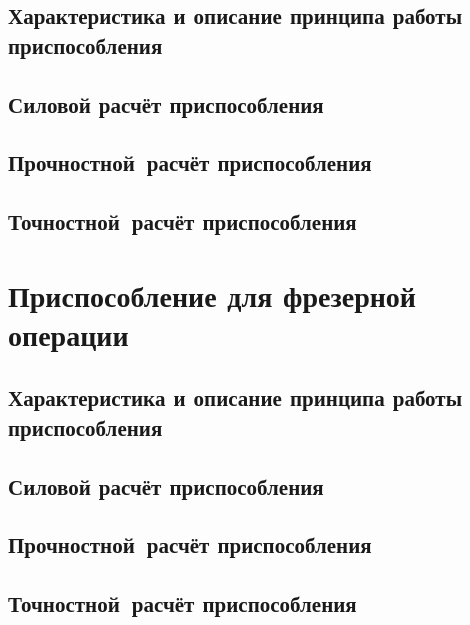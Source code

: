\documentclass[14pt,russian,a4paper]{extreport}
\begin{document}
\subsection{Характеристика и описание принципа работы приспособления}
\subsection{Силовой расчёт приспособления}
\subsection{Прочностной расчёт приспособления}
\subsection{Точностной расчёт приспособления}

\section{Приспособление для фрезерной операции}

\subsection{Характеристика и описание принципа работы приспособления}
\subsection{Силовой расчёт приспособления}
\subsection{Прочностной расчёт приспособления}
\subsection{Точностной расчёт приспособления}



\nocite{malvyat:okp}

\nocite{burtsev:tm2}
\nocite{bezyazichny:otm}
\nocite{blumenstejn:pto}
\nocite{kosilova:stm2}
\nocite{tarabarin:pto}
\nocite{gost:2-121-73}
\nocite{gost:14-205-83}
\nocite{gost:3-1404-86}
\nocite{gost:3-1118-88}
\nocite{gost:2-105-95}
\nocite{gost:3-1702-79}

\printbibliography[heading=none]
\end{document}
